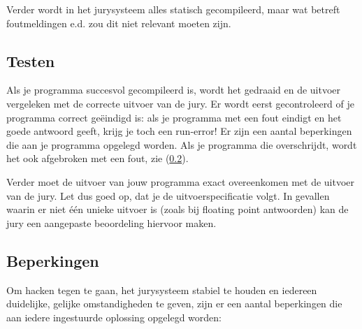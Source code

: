 Verder wordt in het jurysysteem alles statisch gecompileerd, maar
wat betreft foutmeldingen e.d. zou dit niet relevant moeten zijn.

\subsection{Testen}

Als je programma succesvol gecompileerd is, wordt het gedraaid en de
uitvoer vergeleken met de correcte uitvoer van de jury. Er wordt eerst
gecontroleerd of je programma correct ge\"eindigd is: als je programma
met een fout eindigt en het goede antwoord geeft, krijg je toch een
run-error! Er zijn een aantal beperkingen die aan je programma
opgelegd worden. Als je programma die overschrijdt, wordt het ook
afgebroken met een fout, zie (\ref{runlimits}).

Verder moet de uitvoer van jouw programma exact overeenkomen met de
uitvoer van de jury. Let dus goed op, dat je de uitvoerspecificatie
volgt. In gevallen waarin er niet \'e\'en unieke uitvoer is (zoals bij
floating point antwoorden) kan de jury een aangepaste beoordeling
hiervoor maken.

\subsection{Beperkingen}\label{runlimits}

Om hacken tegen te gaan, het jurysysteem stabiel te houden en iedereen
duidelijke, gelijke omstandigheden te geven, zijn er een aantal
beperkingen die aan iedere ingestuurde oplossing opgelegd worden:

